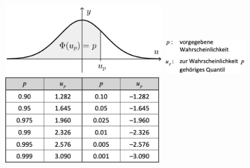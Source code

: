 \documentclass[8pt,a4paper]{scrartcl}
\begin{document}
\begin{multicols*}{2}
		\begin{multicols*}{2}
			\includegraphics[height=3cm]{img/Quantile_Standardnormalverteilung1.png}
			\includegraphics[height=1.5cm]{img/Quantile_Standardnormalverteilung2.png} \\
			\includegraphics[height=3.75cm]{img/Quantile_Standardnormalverteilung3.png}
		\end{multicols*}


\end{multicols*}
\end{document}
